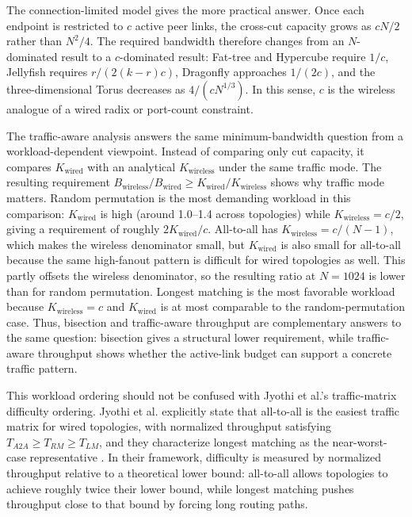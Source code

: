 \documentclass[conference]{IEEEtran}
\begin{document}
The connection-limited model gives the more practical answer. Once each endpoint is restricted to \(c\) active peer links, the cross-cut capacity grows as \(cN/2\) rather than \(N^2/4\). The required bandwidth therefore changes from an \(N\)-dominated result to a \(c\)-dominated result: Fat-tree and Hypercube require \(1/c\), Jellyfish requires \(r/(2(k-r)c)\), Dragonfly approaches \(1/(2c)\), and the three-dimensional Torus decreases as \(4/(cN^{1/3})\). In this sense, \(c\) is the wireless analogue of a wired radix or port-count constraint.

The traffic-aware analysis answers the same minimum-bandwidth question from a workload-dependent viewpoint. Instead of comparing only cut capacity, it compares \(K_{\mathrm{wired}}\) with an analytical \(K_{\mathrm{wireless}}\) under the same traffic mode. The resulting requirement \(B_{\mathrm{wireless}}/B_{\mathrm{wired}} \ge K_{\mathrm{wired}}/K_{\mathrm{wireless}}\) shows why traffic mode matters. Random permutation is the most demanding workload in this comparison: \(K_{\mathrm{wired}}\) is high (around 1.0--1.4 across topologies) while \(K_{\mathrm{wireless}}=c/2\), giving a requirement of roughly \(2K_{\mathrm{wired}}/c\). All-to-all has \(K_{\mathrm{wireless}}=c/(N-1)\), which makes the wireless denominator small, but \(K_{\mathrm{wired}}\) is also small for all-to-all because the same high-fanout pattern is difficult for wired topologies as well. This partly offsets the wireless denominator, so the resulting ratio at \(N=1024\) is lower than for random permutation. Longest matching is the most favorable workload because \(K_{\mathrm{wireless}}=c\) and \(K_{\mathrm{wired}}\) is at most comparable to the random-permutation case. Thus, bisection and traffic-aware throughput are complementary answers to the same question: bisection gives a structural lower requirement, while traffic-aware throughput shows whether the active-link budget can support a concrete traffic pattern.

This workload ordering should not be confused with Jyothi et al.'s traffic-matrix difficulty ordering. Jyothi et al. explicitly state that all-to-all is the easiest traffic matrix for wired topologies, with normalized throughput satisfying \(T_{A2A} \ge T_{RM} \ge T_{LM}\), and they characterize longest matching as the near-worst-case representative \cite{jyothi2016}. In their framework, difficulty is measured by normalized throughput relative to a theoretical lower bound: all-to-all allows topologies to achieve roughly twice their lower bound, while longest matching pushes throughput close to that bound by forcing long routing paths.
\end{document}
